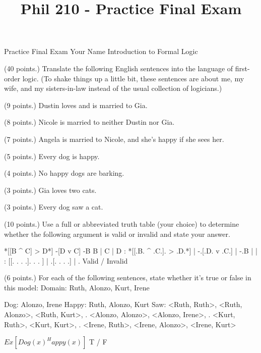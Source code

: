 
\title{Phil 210 - Practice Final Exam}

\heading
Practice Final Exam
Your Name
Introduction to Formal Logic
\endheading

(40 points.) Translate the following English sentences into the language of first-order logic. (To shake things up a little bit, these sentences are about me, my wife, and my sisters-in-law instead of the usual collection of logicians.)

\quantifiers
\problems
{} (9 points.)
Dustin loves and is married to Gia.
	\answer
	$ $
	\endanswer

 (8 points.)
Nicole is married to neither Dustin nor Gia.
	\answer
	$ $
	\endanswer

 (7 points.)
Angela is married to Nicole, and she's happy if she sees her.
	\answer
	$ $
	\endanswer

 (5 points.)
Every dog is happy.
	\answer
	$ $
	\endanswer

 (4 points.)
No happy dogs are barking.
	\answer
	$ $
	\endanswer

 (3 points.)
Gia loves two cats.
	\answer
	$ $
	\endanswer

 (3 points.)
Every dog saw a cat.
	\answer
	$ $
	\endanswer

\endproblems

(10 points.) Use a full or abbreviated truth table (your choice) to determine whether the following argument is valid or invalid and state your answer.

\problems
{}
\argument
 *[[B ^ C] > D*]
 -[D v C]
\argumentline
 -B
\endargument
	\answer
	\truthtable
	 B | C | D : *[[.B. ^ .C.]. > .D.*] | -.[.D. v .C.] | -.B
	\truthtableline
	   |   |   :  [[. .   . .].   . . ] |  .[. .   . .] |  . 
	\endtruthtable
	Valid / Invalid
	\endanswer

\endproblems

(6 points.) For each of the following sentences, state whether it's true or false in this model:
\answer
	\firstordermodel 
	Domain: Ruth, Alonzo, Kurt, Irene

	Dog:    Alonzo, Irene
	Happy:  Ruth, Alonzo, Kurt
	Saw:    <Ruth, Ruth>, <Ruth, Alonzo>, <Ruth, Kurt>,
	   .    <Alonzo, Alonzo>, <Alonzo, Irene>,
	   .    <Kurt, Ruth>, <Kurt, Kurt>,
	   .    <Irene, Ruth>, <Irene, Alonzo>, <Irene, Kurt>
	\endfirstordermodel
\endanswer\bigskip

\problems
{}
$ Ex[Dog(x) ^ Happy(x)] $
	\answer
	 T / F
	\endanswer

